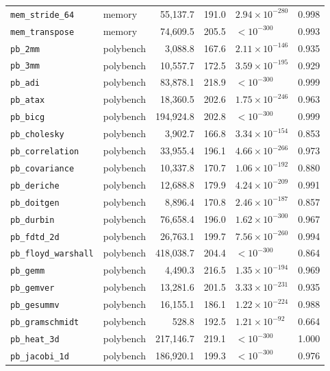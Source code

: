 {\begin{longtable}{llrrp{2.0cm}r}
\texttt{mem\_stride\_64} & memory & 55,137.7 & 191.0 & $2.94\times10^{-280}$ & 0.998 \\
\texttt{mem\_transpose} & memory & 74,609.5 & 205.5 & $<10^{-300}$ & 0.993 \\
\texttt{pb\_2mm} & polybench & 3,088.8 & 167.6 & $2.11\times10^{-146}$ & 0.935 \\
\texttt{pb\_3mm} & polybench & 10,557.7 & 172.5 & $3.59\times10^{-195}$ & 0.929 \\
\texttt{pb\_adi} & polybench & 83,878.1 & 218.9 & $<10^{-300}$ & 0.999 \\
\texttt{pb\_atax} & polybench & 18,360.5 & 202.6 & $1.75\times10^{-246}$ & 0.963 \\
\texttt{pb\_bicg} & polybench & 194,924.8 & 202.8 & $<10^{-300}$ & 0.999 \\
\texttt{pb\_cholesky} & polybench & 3,902.7 & 166.8 & $3.34\times10^{-154}$ & 0.853 \\
\texttt{pb\_correlation} & polybench & 33,955.4 & 196.1 & $4.66\times10^{-266}$ & 0.973 \\
\texttt{pb\_covariance} & polybench & 10,337.8 & 170.7 & $1.06\times10^{-192}$ & 0.880 \\
\texttt{pb\_deriche} & polybench & 12,688.8 & 179.9 & $4.24\times10^{-209}$ & 0.991 \\
\texttt{pb\_doitgen} & polybench & 8,896.4 & 170.8 & $2.46\times10^{-187}$ & 0.857 \\
\texttt{pb\_durbin} & polybench & 76,658.4 & 196.0 & $1.62\times10^{-300}$ & 0.967 \\
\texttt{pb\_fdtd\_2d} & polybench & 26,763.1 & 199.7 & $7.56\times10^{-260}$ & 0.994 \\
\texttt{pb\_floyd\_warshall} & polybench & 418,038.7 & 204.4 & $<10^{-300}$ & 0.864 \\
\texttt{pb\_gemm} & polybench & 4,490.3 & 216.5 & $1.35\times10^{-194}$ & 0.969 \\
\texttt{pb\_gemver} & polybench & 13,281.6 & 201.5 & $3.33\times10^{-231}$ & 0.935 \\
\texttt{pb\_gesummv} & polybench & 16,155.1 & 186.1 & $1.22\times10^{-224}$ & 0.988 \\
\texttt{pb\_gramschmidt} & polybench & 528.8 & 192.5 & $1.21\times10^{-92}$ & 0.664 \\
\texttt{pb\_heat\_3d} & polybench & 217,146.7 & 219.1 & $<10^{-300}$ & 1.000 \\
\texttt{pb\_jacobi\_1d} & polybench & 186,920.1 & 199.3 & $<10^{-300}$ & 0.976 \\

\end{longtable}}
